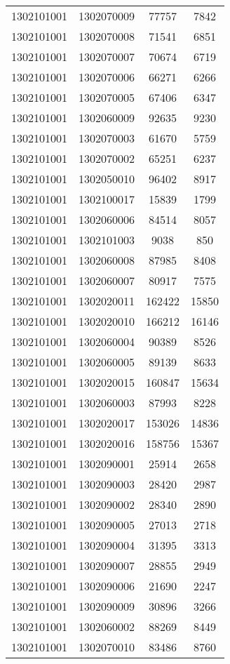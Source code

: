\begin{longtable}{llcc}
1302101001 & 1302070009 & 77757 & 7842\\
1302101001 & 1302070008 & 71541 & 6851\\
1302101001 & 1302070007 & 70674 & 6719\\
1302101001 & 1302070006 & 66271 & 6266\\
1302101001 & 1302070005 & 67406 & 6347\\
1302101001 & 1302060009 & 92635 & 9230\\
1302101001 & 1302070003 & 61670 & 5759\\
1302101001 & 1302070002 & 65251 & 6237\\
1302101001 & 1302050010 & 96402 & 8917\\
1302101001 & 1302100017 & 15839 & 1799\\
1302101001 & 1302060006 & 84514 & 8057\\
1302101001 & 1302101003 & 9038 & 850\\
1302101001 & 1302060008 & 87985 & 8408\\
1302101001 & 1302060007 & 80917 & 7575\\
1302101001 & 1302020011 & 162422 & 15850\\
1302101001 & 1302020010 & 166212 & 16146\\
1302101001 & 1302060004 & 90389 & 8526\\
1302101001 & 1302060005 & 89139 & 8633\\
1302101001 & 1302020015 & 160847 & 15634\\
1302101001 & 1302060003 & 87993 & 8228\\
1302101001 & 1302020017 & 153026 & 14836\\
1302101001 & 1302020016 & 158756 & 15367\\
1302101001 & 1302090001 & 25914 & 2658\\
1302101001 & 1302090003 & 28420 & 2987\\
1302101001 & 1302090002 & 28340 & 2890\\
1302101001 & 1302090005 & 27013 & 2718\\
1302101001 & 1302090004 & 31395 & 3313\\
1302101001 & 1302090007 & 28855 & 2949\\
1302101001 & 1302090006 & 21690 & 2247\\
1302101001 & 1302090009 & 30896 & 3266\\
1302101001 & 1302060002 & 88269 & 8449\\
1302101001 & 1302070010 & 83486 & 8760\\

\end{longtable}
